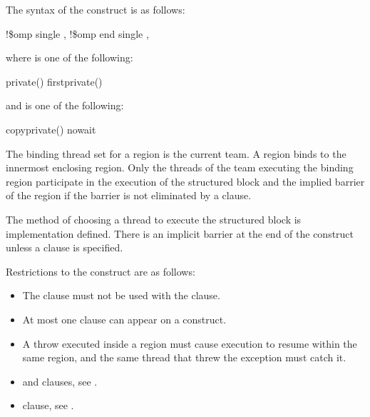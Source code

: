 \fortranspecificstart
The syntax of the  construct is as follows:

\begin{boxedcode}
!\$omp single \plc{[clause[ [},\plc{] clause] ... ]}
!\$omp end single \plc{[end\_clause[ [},\plc{] end\_clause] ... ]}
\end{boxedcode}

where  is one of the following:

\begin{indentedcodelist}
private()
firstprivate()
\end{indentedcodelist}

and  is one of the following: 

\begin{indentedcodelist}
copyprivate()
nowait
\end{indentedcodelist}
\fortranspecificend

\binding
The binding thread set for a  region is the current team. A  region 
binds to the innermost enclosing  region. Only the threads of the team 
executing the binding  region participate in the execution of the structured 
block and the implied barrier of the  region if the barrier is not eliminated by a 
 clause.

\descr
The method of choosing a thread to execute the structured block is implementation 
defined. There is an implicit barrier at the end of the  construct unless a 
 clause is specified. 

\restrictions
Restrictions to the  construct are as follows: 

\begin{itemize}
\item The  clause must not be used with the  clause.

\item At most one  clause can appear on a  construct.

\cppspecificstart
\item A throw executed inside a  region must cause execution to resume within the 
same  region, and the same thread that threw the exception must catch it.
\cppspecificend
\end{itemize}


\crossreferences
\begin{itemize}
\item {} and  clauses, see 
.

\item {} clause, see 
.
\end{itemize}



